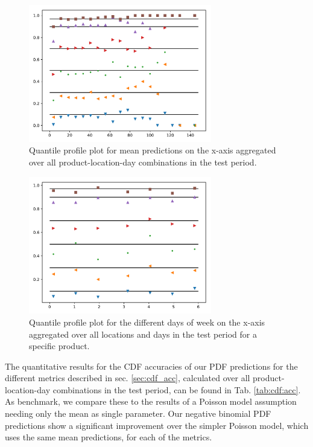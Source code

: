 \documentclass[BCOR=1mm, DIV=calc,10pt,
twoside=true,
twocolumn,
headings=normal]{scrartcl}
\newcommand{\tab}{Tab. }
\begin{document}
\begin{figure}
\begin{center}
\includegraphics[width=8cm]{../figures/invquant_yhat_mean}
\caption{\label{fig:invquant_mean} Quantile profile plot for mean predictions on the x-axis aggregated over all product-location-day combinations in the test period.}
\end{center}
\end{figure}

\begin{figure}
\begin{center}
\includegraphics[width=8cm]{../figures/invquant_dayofweek}
\caption{\label{fig:invquant_dayofweek} Quantile profile plot for the different days of week on the x-axis aggregated over all locations and days in the test period for a specific product.}
\end{center}
\end{figure}

The quantitative results for the CDF accuracies of our PDF predictions for the different metrics described in sec. \ref{sec:cdf_acc}, calculated over all product-location-day combinations in the test period, can be found in \tab \ref{tab:cdf:acc}. As benchmark, we compare these to the results of a Poisson model assumption needing only the mean as single parameter. Our negative binomial PDF predictions show a significant improvement over the simpler Poisson model, which uses the same mean predictions, for each of the metrics.
\end{document}
